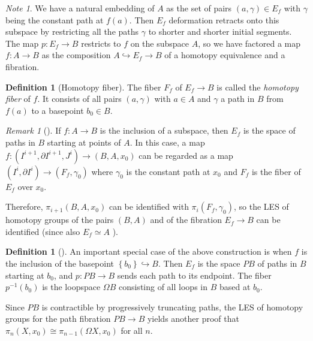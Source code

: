 \documentclass[reqno]{amsart}
\theoremstyle{definition}
\newtheorem{definition}[theorem]{Definition}
\theoremstyle{remark}
\newtheorem*{remark}{Remark}
\newtheorem*{note}{Note}
\begin{document}
     \begin{note}
         We have a natural embedding of $A$ as
         the set of pairs
         $(a,\gamma) \in E_f$ with
         $\gamma$ being the constant path
         at $f(a)$. Then
         $E_f$ deformation retracts onto this
         subspace by restricting all the paths
         $\gamma$ to shorter and shorter initial segments.
         The map $p \colon E_f \to B$ restricts
         to $f$ on the subspace $A$, so we have factored
         a map $f \colon A \to B$ as the composition
         $A \hookrightarrow E_f \to B$ of
         a homotopy equivalence and a fibration.
     \end{note}

     \begin{definition}[Homotopy fiber]
         The fiber $F_f$ of $E_f \to B$ is called
         the \textit{homotopy fiber} of $f$.
         It consists of all pairs
         $(a,\gamma)$ with $a \in A$ and
         $\gamma $ a path in $B$ from $f(a)$ to
         a basepoint $b_0 \in B$.
     \end{definition}

     \begin{remark}[]
         If $f \colon A \to B$ is the inclusion of a
         subspace, then $E_f$ is the space of paths
         in $B$ starting at points of $A$.
         In this case, a map
         $f \colon \left( I^{i+1},
         \partial I^{i+1}, J^{i} \right) \to 
         \left( B,A,x_0 \right) $ can be regarded
         as a map $\left( I^{i}, \partial I^{i} \right) 
         \to \left( F_f, \gamma_0 \right) $ where
         $\gamma_0$ is the constant path at $x_0$ and
         $F_f$ is the fiber of $E_f$ over $x_0$.

         Therefore, $\pi_{i+1}(B,A,x_0)$ can be identified
         with $\pi_i (F_f, \gamma_0)$, so the LES
         of homotopy groups of the pairs $(B,A)$ and of
         the fibration $E_f \to B$ can be identified (since
         also $E_f \simeq A$ ).
     \end{remark}

     \begin{definition}[]
         An important special case of the above construction is
         when $f$ is the inclusion of the
         basepoint
         $\left\{ b_0 \right\} \hookrightarrow B$.
         Then $E_f$ is the space $PB$ of paths in $B$ starting
         at $b_0$, and $p \colon PB \to B$ sends each path
         to its endpoint. The fiber
         $p^{-1}(b_0)$ is the loopspace
         $\Omega B$ consisting of all loops
         in $B$ based at $b_0$.

         Since $PB$ is contractible by progressively truncating
         paths, the LES of homotopy groups for the
         path fibration $PB \to B$ yields another
         proof that
         $\pi_n (X,x_0) \cong \pi_{n-1}\left( \Omega
         X, x_0\right) $ for all $n$.
     \end{definition}
\end{document}
